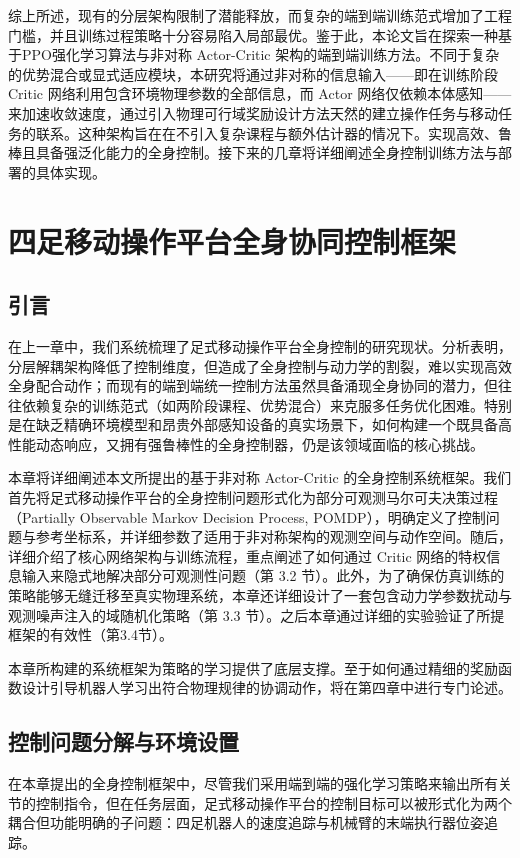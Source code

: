 综上所述，现有的分层架构限制了潜能释放，而复杂的端到端训练范式增加了工程门槛，并且训练过程策略十分容易陷入局部最优。鉴于此，本论文旨在探索一种基于PPO强化学习算法与非对称 Actor-Critic 架构的端到端训练方法。不同于复杂的优势混合或显式适应模块，本研究将通过非对称的信息输入——即在训练阶段 Critic 网络利用包含环境物理参数的全部信息，而 Actor 网络仅依赖本体感知——来加速收敛速度，通过引入物理可行域奖励设计方法天然的建立操作任务与移动任务的联系。这种架构旨在在不引入复杂课程与额外估计器的情况下。实现高效、鲁棒且具备强泛化能力的全身控制。接下来的几章将详细阐述全身控制训练方法与部署的具体实现。


\chapter{四足移动操作平台全身协同控制框架}

\section{引言}
在上一章中，我们系统梳理了足式移动操作平台全身控制的研究现状。分析表明，分层解耦架构降低了控制维度，但造成了全身控制与动力学的割裂，难以实现高效全身配合动作；而现有的端到端统一控制方法虽然具备涌现全身协同的潜力，但往往依赖复杂的训练范式（如两阶段课程、优势混合）来克服多任务优化困难。特别是在缺乏精确环境模型和昂贵外部感知设备的真实场景下，如何构建一个既具备高性能动态响应，又拥有强鲁棒性的全身控制器，仍是该领域面临的核心挑战。

本章将详细阐述本文所提出的基于非对称 Actor-Critic 的全身控制系统框架。我们首先将足式移动操作平台的全身控制问题形式化为部分可观测马尔可夫决策过程（Partially Observable Markov Decision Process, POMDP），明确定义了控制问题与参考坐标系，并详细参数了适用于非对称架构的观测空间与动作空间。随后，详细介绍了核心网络架构与训练流程，重点阐述了如何通过 Critic 网络的特权信息输入来隐式地解决部分可观测性问题（第 3.2 节）。此外，为了确保仿真训练的策略能够无缝迁移至真实物理系统，本章还详细设计了一套包含动力学参数扰动与观测噪声注入的域随机化策略（第 3.3 节）。之后本章通过详细的实验验证了所提框架的有效性（第3.4节）。

本章所构建的系统框架为策略的学习提供了底层支撑。至于如何通过精细的奖励函数设计引导机器人学习出符合物理规律的协调动作，将在第四章中进行专门论述。

\section{控制问题分解与环境设置}
在本章提出的全身控制框架中，尽管我们采用端到端的强化学习策略来输出所有关节的控制指令，但在任务层面，足式移动操作平台的控制目标可以被形式化为两个耦合但功能明确的子问题：四足机器人的速度追踪与机械臂的末端执行器位姿追踪。

